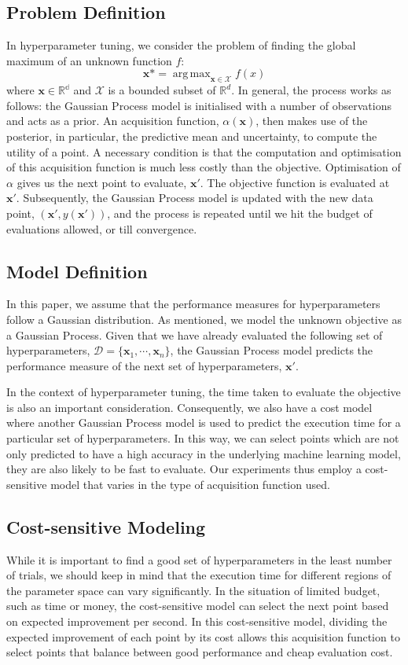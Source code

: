 \documentclass[letterpaper]{article}
\DeclareMathOperator*{\argmax}{arg\,max}
\begin{document}
\subsection{Problem Definition}
In hyperparameter tuning, we consider the problem of finding the global maximum of
an unknown function $f$:
$$\textbf{x*}=\argmax_{\textbf{x}\in\mathcal{X}}{f(x)}$$
where $\textbf{x} \in \mathbb{R^d}$ and $\mathcal{X}$ is a bounded subset of 
$\mathbb{R}^d$. In general, the process works as follows: the Gaussian Process model
is initialised with a number of observations and acts as a prior.
An acquisition function, $\alpha(\textbf{x})$, then makes use
of the posterior, in particular, the predictive mean and uncertainty,
to compute the utility of a point. A necessary condition is that the computation and
optimisation of this acquisition function is much less costly than the objective.
Optimisation of $\alpha$ gives us the next point to evaluate, $\textbf{x}'$. The
objective function is evaluated at $\textbf{x}'$. Subsequently, the Gaussian Process 
model is updated with the new data point, $(\textbf{x}', y(\textbf{x}'))$, and the
process is repeated until we hit the budget of evaluations allowed, or till
convergence.

\subsection{Model Definition}
In this paper, we assume that the performance measures for hyperparameters follow a 
Gaussian distribution. As mentioned, we model the unknown objective as a Gaussian Process.
Given that we have already evaluated the following set of hyperparameters, 
$\mathcal{D}=\{\textbf{x}_1, \cdots, \textbf{x}_n\}$, the Gaussian 
Process model predicts the performance measure of the next set of hyperparameters,
$\textbf{x}'$.

In the context of hyperparameter tuning, the time taken to evaluate the objective is
also an important consideration. Consequently, we also have a cost model where
another Gaussian Process model is used to predict the execution time for a particular
set of hyperparameters. In this way, we can select points which are not only
predicted to have a high accuracy in the underlying machine learning model, they
are also likely to be fast to evaluate. Our experiments thus employ
a cost-sensitive model that varies in the type of acquisition function used.

\subsection{Cost-sensitive Modeling}
While it is important to find a good set of hyperparameters in the least number of 
trials, we should keep in mind that the execution time for different regions of the 
parameter space can vary significantly. In the situation of limited budget, such as 
time or money, the cost-sensitive model can select the next point based on expected 
improvement per second. In this cost-sensitive model, dividing the expected improvement 
of each point by its cost allows this acquisition function to select points that 
balance between good performance and cheap evaluation cost.
\end{document}
